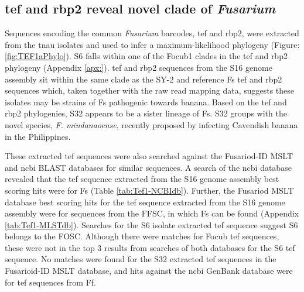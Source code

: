 \subsection{\acl{tef} and \acl{rbp2} reveal novel clade of \textit{Fusarium}}

 Sequences encoding the common \textit{Fusarium} barcodes, \ac{tef}  and \acf{rbp2}, were extracted from the \ac{tnau} isolates and used to infer a maximum-likelihood phylogeny (Figure: \ref{fig:TEF1aPhylo}). S6 falls within one of the \ac{Focub1} clades in the \acs{tef} and \ac{rbp2} phylogeny (Appendix \ref{apx:}). \Ac{tef} and \ac{rbp2} sequences from the S16 genome assembly sit within the same clade as the SY-2 and reference \ac{Fs} \ac{tef} and \ac{rbp2} sequences which, taken together with the raw read mapping data, suggests these isolates may be strains of \ac{Fs} pathogenic towards banana. Based on the \ac{tef} and \ac{rbp2} phylogenies, S32 appears to be a sister lineage of \ac{Fs}. S32 groups with the novel species, \textit{F. mindanaoense}, recently proposed by  \textcite{Nozawa2023} infecting Cavendish banana in the Philippines. 

These extracted \ac{tef} sequences were also searched against the Fusariod-ID MSLT and \ac{ncbi} BLAST databases for similar sequences. A search of the \ac{ncbi} database revealed that the \ac{tef} sequence extracted from the S16 genome assembly best scoring hits were for \ac{Fs} (Table \ref{tab:Tef1-NCBIdb}). Further, the Fusariod MSLT database best scoring hits for the \ac{tef} sequence extracted from the S16 genome assembly were for sequences from the \ac{FFSC}, in which \ac{Fs} can be found (Appendix \ref{tab:Tef1-MLSTdb}). Searches for the S6 isolate extracted \ac{tef} sequence suggest S6 belongs to the \ac{FOSC}. Although there were matches for \ac{Focub} \ac{tef} sequences, these were not in the top 3 results from searches of both databases for the S6 \ac{tef} sequence. No matches were found for the S32 extracted \ac{tef} sequences in the Fusarioid-ID MSLT database, and hits against the \ac{ncbi} GenBank database were for \ac{tef} sequences from \ac{Ff}. 



